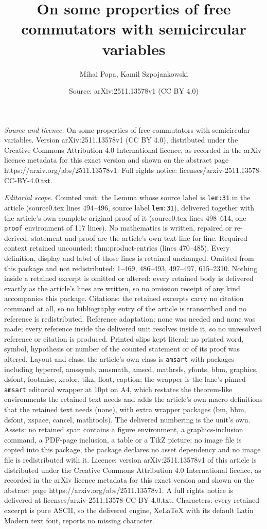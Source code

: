 \documentclass[10pt,a4paper]{amsart}
\title[On some properties of free commutators with semicircular var]{On some properties of free commutators with semicircular variables}
\author{Mihai Popa, Kamil Szpojankowski}
\date{Source: arXiv:2511.13578v1 (CC BY 4.0)}
\begin{document}
\maketitle

\noindent\emph{Source and licence.} On some properties of free commutators with semicircular variables. Version arXiv:2511.13578v1 (CC BY 4.0), distributed under the Creative Commons Attribution 4.0 International licence, as recorded in the arXiv licence metadata for this exact version and shown on the abstract page https://arxiv.org/abs/2511.13578v1. Full rights notice: licenses/arxiv-2511.13578-CC-BY-4.0.txt.\par\smallskip

\noindent\textit{Editorial scope.} Counted unit: the Lemma whose source label is \texttt{lem:31} in the article (source0.tex lines 494--496, source label \texttt{lem:31}), delivered together with the article's own complete original proof of it (source0.tex lines 498--614, one \texttt{proof} environment of 117 lines). No mathematics is written, repaired or re-derived: statement and proof are the article's own text line for line. Required context retained uncounted: thm:product-entries (lines 470--485). Every definition, display and label of those lines is retained unchanged. Omitted from this package and not redistributed: 1--469, 486--493, 497--497, 615--2310. Nothing inside a retained excerpt is omitted or altered: every retained body is delivered exactly as the article's lines are written, so no omission receipt of any kind accompanies this package. Citations: the retained excerpts carry no citation command at all, so no bibliography entry of the article is transcribed and no reference is redistributed. Reference adaptation: none was needed and none was made; every reference inside the delivered unit resolves inside it, so no unresolved reference or citation is produced. Printed slips kept literal: no printed word, symbol, hypothesis or number of the counted statement or of its proof was altered. Layout and class: the article's own class is \texttt{amsart} with packages including hyperref, amssymb, amsmath, amscd, mathrsfs, yfonts, bbm, graphics, dsfont, footmisc, xcolor, tikz, float, caption; the wrapper is the lane's pinned \texttt{amsart} editorial wrapper at 10pt on A4, which restates the theorem-like environments the retained text needs and adds the article's own macro definitions that the retained text needs (none), with extra wrapper packages (bm, bbm, dsfont, xspace, cancel, mathtools). The delivered numbering is the unit's own. Assets: no retained span contains a figure environment, a graphics-inclusion command, a PDF-page inclusion, a table or a TikZ picture; no image file is copied into this package, the package declares no asset dependency and no image file is redistributed with it. Licence: version arXiv:2511.13578v1 of this article is distributed under the Creative Commons Attribution 4.0 International licence, as recorded in the arXiv licence metadata for this exact version and shown on the abstract page https://arxiv.org/abs/2511.13578v1. A full rights notice is delivered at licenses/arxiv-2511.13578-CC-BY-4.0.txt. Characters: every retained excerpt is pure ASCII, so the delivered engine, XeLaTeX with its default Latin Modern text font, reports no missing character.
\end{document}
